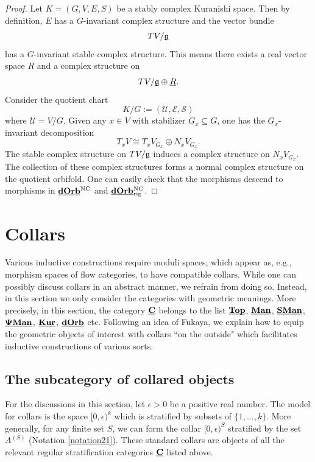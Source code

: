 \documentclass[reqno, 10pt]{amsart}
\numberwithin{equation}{section}
\numberwithin{equation}{section}
\renewcommand{\subset}{\subseteq}
\theoremstyle{definition}
\theoremstyle{remark}
\newcommand{\beqn}{\begin{equation*}}
\newcommand{\eeqn}{\end{equation*}}
\newcommand{\mc}{\mathcal}
\newcommand{\mf}{\mathfrak}
\newcommand{\pman}{\uds{{\bf \Psi}{\bf Man}}}
\newcommand{\uds}[1]{\underline{\smash{#1}}}
\begin{document}
\begin{proof}
Let $K = (G, V, E, S)$ be a stably complex Kuranishi space. Then by definition, $E$ has a $G$-invariant complex structure and the vector bundle 
\beqn
TV/ \uds{\mf g}
\eeqn
has a $G$-invariant stable complex structure. This means there exists a real vector space $R$ and a complex structure on 
\beqn
TV/ \uds{\mf g} \oplus \uds R.
\eeqn
Consider the quotient chart
\beqn
K/G:= ({\mc U}, {\mc E}, {\mc S})
\eeqn
where ${\mc U} = V/ G$. Given any $x \in V$ with stabilizer $G_x \subset G$, one has the $G_x$-invariant decomposition 
\beqn
T_x V \cong T_x V_{G_x} \oplus N_x V_{G_x}.
\eeqn
The stable complex structure on $TV/\uds{\mf g}$ induces a complex structure on $N_x V_{G_x}$. The collection of these complex structures forms a normal complex structure on the quotient orbifold. One can easily check that the morphisms descend to morphisms in $\uds{\bf dOrb}^{{\rm NC}}$ and $\uds{\bf dOrb}^{{\rm NC}}_{\rm rig}$.
\end{proof}

\section{Collars}

Various inductive constructions require moduli spaces, which appear as, e.g., morphism spaces of flow categories, to have compatible collars. While one can possibly discuss collars in an abstract manner, we refrain from doing so. Instead, in this section we only consider the categories with geometric meanings. More precisely, in this section, the category $\uds{\bf C}$ belongs to the list $\uds{\bf Top}$, $\uds{\bf Man}$, $\uds{\bf SMan}$, $\pman$, $\uds{\bf Kur}$, $\uds{\bf dOrb}$ etc. Following an idea of Fukaya, we explain how to equip the geometric objects of interest with collars ``on the outside" which facilitates inductive constructions of various sorts.


\subsection{The subcategory of collared objects}


For the discussions in this section, let $\epsilon > 0$ be a positive real number. The model for collars is the space $[0, \epsilon)^k$ which is stratified by subsets of $\{1, \ldots, k\}$. More generally, for any finite set $S$, we can form the collar $[0, \epsilon)^S$ stratified by the set $A^{(S)}$ (Notation \ref{notation21}). These standard collars are objects of all the relevant regular stratification categories $\uds{\bf C}$ listed above.
\end{document}
